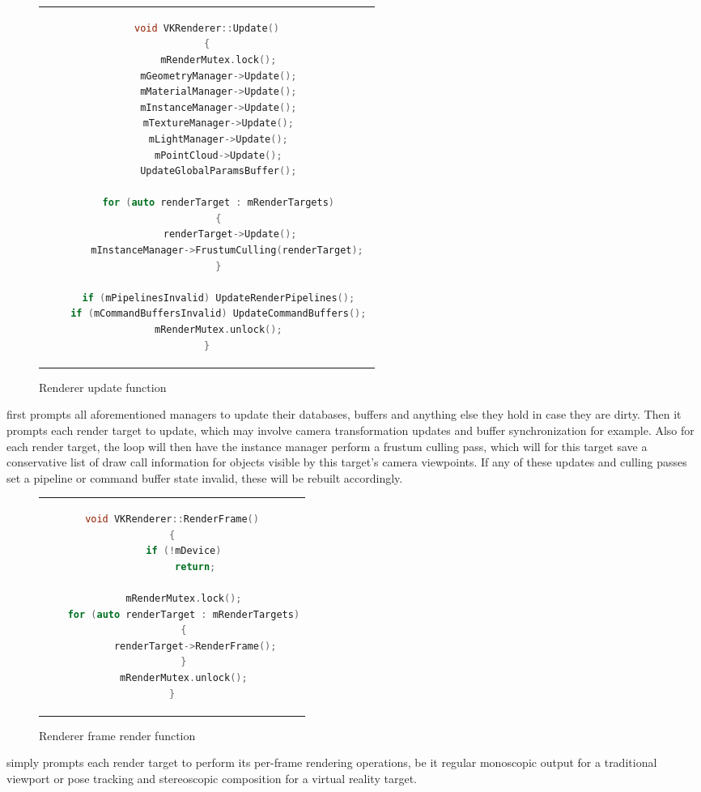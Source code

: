 \begin{figure}[htpb]
  \centering
  \begin{tabular}{c}
  \begin{lstlisting}[language=C++]
    void VKRenderer::Update()
{
	mRenderMutex.lock();
	mGeometryManager->Update();
	mMaterialManager->Update();
	mInstanceManager->Update();
	mTextureManager->Update();
	mLightManager->Update();
	mPointCloud->Update();
	UpdateGlobalParamsBuffer();

	for (auto renderTarget : mRenderTargets)
	{
		renderTarget->Update();
		mInstanceManager->FrustumCulling(renderTarget); 
	}

	if (mPipelinesInvalid) UpdateRenderPipelines();
	if (mCommandBuffersInvalid) UpdateCommandBuffers();
	mRenderMutex.unlock();
}
  \end{lstlisting}
  \end{tabular}
  \caption[VKRenderer's Update]{Renderer update function}\label{fig:lst_VKRenderer_Update}
\end{figure}

 first prompts all aforementioned managers to update their databases, buffers and anything else they hold in case they are dirty. Then it prompts each render target to update, which may involve camera transformation updates and buffer synchronization for example. Also for each render target, the loop will then have the instance manager perform a frustum culling pass, which will for this target save a conservative list of draw call information for objects visible by this target's camera viewpoints. 
If any of these updates and culling passes set a pipeline or command buffer state invalid, these will be rebuilt accordingly.  

\begin{figure}[htpb]
  \centering
  \begin{tabular}{c}
  \begin{lstlisting}[language=C++]
void VKRenderer::RenderFrame()
{
	if (!mDevice)
		return;

	mRenderMutex.lock();
	for (auto renderTarget : mRenderTargets)
	{
		renderTarget->RenderFrame();
	}
	mRenderMutex.unlock();
}
	\end{lstlisting}
  \end{tabular}
  \caption[VKRenderer's RenderFrame]{Renderer frame render function}\label{fig:lst_VKRenderer_RenderFrame}
\end{figure}

 simply prompts each render target to perform its per-frame rendering operations, be it regular monoscopic output for a traditional viewport or pose tracking and stereoscopic composition for a virtual reality target. 

